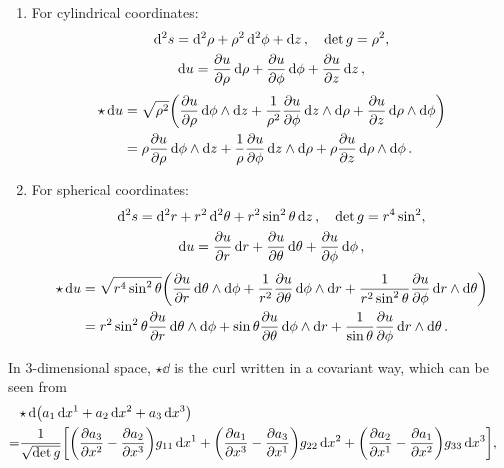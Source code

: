 \documentclass[10pt]{article}
\begin{document}
	\begin{example}
		\begin{enumerate}
			\item For cylindrical coordinates:
			\begin{gather*}
				\dd[2]{s} = \dd[2]{\rho} + \rho^2 \dd[2]{\phi} + \dd{z}, \quad \det g = \rho^2, \\
				\dd{u} = \pdv{u}{\rho} \dd{\rho} + \pdv{u}{\phi} \dd{\phi} + \pdv{u}{z} \dd{z},
			\end{gather*}
			\begin{align*}
				\star \dd{u} &= \sqrt{\rho^2} \qty(\pdv{u}{\rho} \dd{\phi} \wedge \dd{z} + \frac{1}{\rho^2} \pdv{u}{\phi} \dd{z} \wedge \dd{\rho} + \pdv{u}{z} \dd{\rho} \wedge \dd{\phi}) \\
				&= \rho \pdv{u}{\rho} \dd{\phi} \wedge \dd{z} + \frac{1}{\rho} \pdv{u}{\phi} \dd{z} \wedge \dd{\rho} + \rho \pdv{u}{z} \dd{\rho} \wedge \dd{\phi}.
			\end{align*}
			\item For spherical coordinates:
			\begin{gather*}
				\dd[2]{s} = \dd[2]{r} + r^2 \dd[2]{\theta} + r^2 \sin^2{\theta} \dd{z}, \quad \det g = r^4 \sin^2, \\
				\dd{u} = \pdv{u}{r} \dd{r} + \pdv{u}{\theta} \dd{\theta} + \pdv{u}{\phi} \dd{\phi},
			\end{gather*}
			\begin{align*}
				\star \dd{u} &= \sqrt{r^4 \sin^2{\theta}} \qty(\pdv{u}{r} \dd{\theta} \wedge \dd{\phi} + \frac{1}{r^2} \pdv{u}{\theta} \dd{\phi} \wedge \dd{r} + \frac{1}{r^2 \sin^2 {\theta}} \pdv{u}{\phi} \dd{r} \wedge \dd{\theta}) \\
				&= r^2 \sin^2{\theta} \pdv{u}{r} \dd{\theta} \wedge \dd{\phi} + \sin{\theta} \pdv{u}{\theta} \dd{\phi} \wedge \dd{r} + \frac{1}{\sin{\theta}} \pdv{u}{\phi} \dd{r} \wedge \dd{\theta}.
			\end{align*}
		\end{enumerate}
	\end{example}
	In 3-dimensional space, $\star\dd$ is the curl written in a covariant way, which can be seen from
	\begin{align*}
		\lefteqn{\star \dd(a_1 \dd{x^1} + a_2 \dd{x^2} + a_3 \dd{x^3})} \\
		=& \frac{1}{\sqrt{\det g}} \qty[\qty(\pdv{a_3}{x^2} - \pdv{a_2}{x^3}) g_{11} \dd{x^1} + \qty(\pdv{a_1}{x^3} - \pdv{a_3}{x^1}) g_{22} \dd{x^2} + \qty(\pdv{a_2}{x^1} - \pdv{a_1}{x^2}) g_{33} \dd{x^3}],
	\end{align*}
\end{document}
